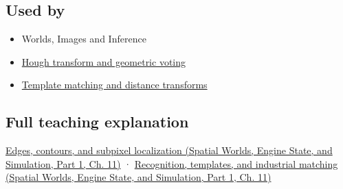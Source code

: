 \subsection{Used by}\label{appendix-36022286b03e-used-by}

\hypertarget{appendix-36022286b03e-used-by}{}

\begin{itemize}
\tightlist
\item
  {Worlds, Images and Inference}
\item
  \hyperref[appendix-a5b0383b3b3e]{Hough transform and geometric voting}
\item
  \hyperref[appendix-5fb4af80d1c7]{Template matching and distance transforms}
\end{itemize}

\subsection{Full teaching explanation}\label{appendix-36022286b03e-full-teaching-explanation}

\hypertarget{appendix-36022286b03e-full-teaching-explanation}{}

\href{../05-Spatial-Worlds-Engine-State-and-Simulation-P01/main.pdf\#04-visual-computing-ii-ch030-edges-contours-and-subpixel-localization}{Edges, contours, and subpixel localization (Spatial Worlds, Engine State, and Simulation, Part 1, Ch. 11)} · \href{../05-Spatial-Worlds-Engine-State-and-Simulation-P01/main.pdf\#04-visual-computing-ii-ch030-recognition-templates-and-industrial-matching}{Recognition, templates, and industrial matching (Spatial Worlds, Engine State, and Simulation, Part 1, Ch. 11)}
